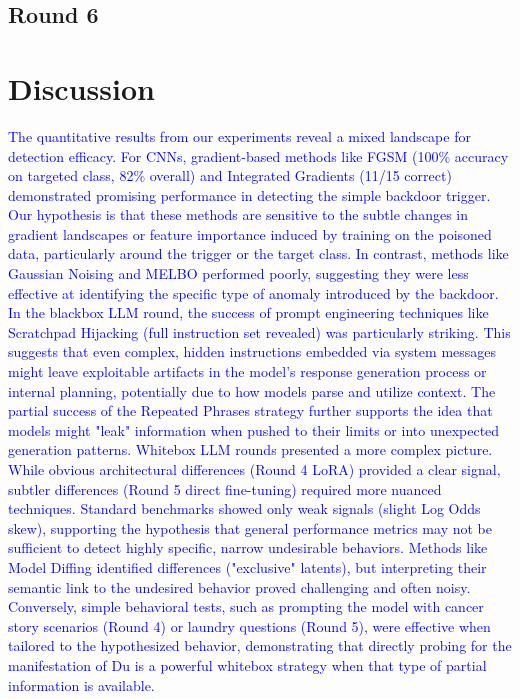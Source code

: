 \documentclass[letterpaper]{article} %
\begin{document}
\subsection{Round 6}

\section{Discussion}
\textcolor{blue}{
The quantitative results from our experiments reveal a mixed landscape for detection efficacy. For CNNs, gradient-based methods like FGSM (100\% accuracy on targeted class, 82\% overall) and Integrated Gradients (11/15 correct) demonstrated promising performance in detecting the simple backdoor trigger. Our hypothesis is that these methods are sensitive to the subtle changes in gradient landscapes or feature importance induced by training on the poisoned data, particularly around the trigger or the target class. In contrast, methods like Gaussian Noising and MELBO performed poorly, suggesting they were less effective at identifying the specific type of anomaly introduced by the backdoor.
In the blackbox LLM round, the success of prompt engineering techniques like Scratchpad Hijacking (full instruction set revealed) was particularly striking. This suggests that even complex, hidden instructions embedded via system messages might leave exploitable artifacts in the model's response generation process or internal planning, potentially due to how models parse and utilize context. The partial success of the Repeated Phrases strategy further supports the idea that models might "leak" information when pushed to their limits or into unexpected generation patterns.
Whitebox LLM rounds presented a more complex picture. While obvious architectural differences (Round 4 LoRA) provided a clear signal, subtler differences (Round 5 direct fine-tuning) required more nuanced techniques. Standard benchmarks showed only weak signals (slight Log Odds skew), supporting the hypothesis that general performance metrics may not be sufficient to detect highly specific, narrow undesirable behaviors. Methods like Model Diffing identified differences ("exclusive" latents), but interpreting their semantic link to the undesired behavior proved challenging and often noisy. Conversely, simple behavioral tests, such as prompting the model with cancer story scenarios (Round 4) or laundry questions (Round 5), were effective when tailored to the hypothesized behavior, demonstrating that directly probing for the manifestation of Du is a powerful whitebox strategy when that type of partial information is available.
}
\end{document}
